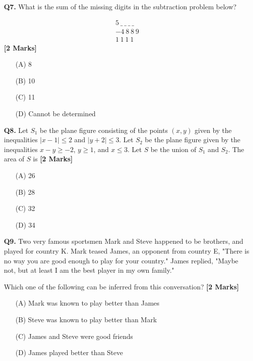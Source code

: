 \documentclass[11pt]{article}
\newcommand{\questionb}[2]{
    \noindent\textbf{Q#2.} #1 \hfill \textbf{[2 Marks]}
}
\begin{document}
\vspace{0.5cm}

\questionb{What is the sum of the missing digits in the subtraction problem below?

\[\begin{array}{c}
5\ \_\ \_\ \_\ \_\ \\ 
-4\ 8\ 8\ 9 \\ 
\hline 
1\ 1\ 1\ 1
\end{array}\]}{7}
\begin{enumerate}
    \item[(A)] 8
    \item[(B)] 10  
    \item[(C)] 11
    \item[(D)] Cannot be determined
\end{enumerate}

\vspace{0.5cm}

\questionb{Let $S_1$ be the plane figure consisting of the points $(x, y)$ given by the inequalities $|x - 1| \leq 2$ and $|y + 2| \leq 3$. Let $S_2$ be the plane figure given by the inequalities $x - y \geq -2$, $y \geq 1$, and $x \leq 3$. Let $S$ be the union of $S_1$ and $S_2$. The area of $S$ is}{8}
\begin{enumerate}
    \item[(A)] 26
    \item[(B)] 28  
    \item[(C)] 32
    \item[(D)] 34
\end{enumerate}

\vspace{0.5cm}

\questionb{Two very famous sportsmen Mark and Steve happened to be brothers, and played for country K. Mark teased James, an opponent from country E, "There is no way you are good enough to play for your country." James replied, "Maybe not, but at least I am the best player in my own family."

Which one of the following can be inferred from this conversation?}{9}
\begin{enumerate}
    \item[(A)] Mark was known to play better than James
    \item[(B)] Steve was known to play better than Mark  
    \item[(C)] James and Steve were good friends
    \item[(D)] James played better than Steve
\end{enumerate}
\end{document}
